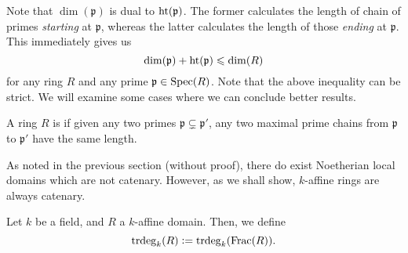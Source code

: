 \documentclass[12pt]{article}
\begin{document}
Note that $\dim(\mathfrak{p})$ is dual to $\operatorname{ht}(\mathfrak{p})$. The former calculates the length of chain of primes \emph{starting} at $\mathfrak{p}$, whereas the latter calculates the length of those \emph{ending} at $\mathfrak{p}$. This immediately gives us
\begin{equation*} 
	\dim(\mathfrak{p}) + \operatorname{ht}(\mathfrak{p}) \leqslant \dim(R)
\end{equation*}
for any ring $R$ and any prime $\mathfrak{p} \in \operatorname{Spec}(R)$.	Note that the above inequality can be strict. We will examine some cases where we can conclude better results. 

\begin{defn}
	A ring $R$ is  if given any two primes $\mathfrak{p} \subsetneq \mathfrak{p}'$, any two maximal prime chains from $\mathfrak{p}$ to $\mathfrak{p}'$ have the same length.
\end{defn}

As noted in the previous section (without proof), there do exist Noetherian local domains which are not catenary. However, as we shall show, $k$-affine rings are always catenary.

\begin{defn}
	Let $k$ be a field, and $R$ a $k$-affine domain. Then, we define
	\begin{equation*} 
		\operatorname{trdeg}_{k}(R) \vcentcolon= \operatorname{trdeg}_{k}(\operatorname{Frac}(R)).
	\end{equation*}
\end{defn}
\end{document}
